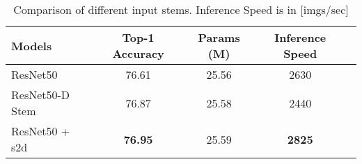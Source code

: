 \begin{table}[ht!]
    \begin{center}
        \small
        \begin{tabular}{|l|c|c|c|c|}
            \hline
            Models & Top-1 Accuracy & Params (M) & Inference Speed \\ \hline
            ResNet50         & 76.61 & 25.56 & 2630 \\ 
            ResNet50-D Stem  & 76.87 & 25.58 & 2440 \\ 
            ResNet50 + s2d   & \textbf{76.95} & 25.59 & \textbf{2825} \\ \hline
        \end{tabular}
    \end{center} 
    \caption{Comparison of different input stems. Inference Speed is in [imgs/sec] }
    \label{table:stem_comparison}
\end{table}